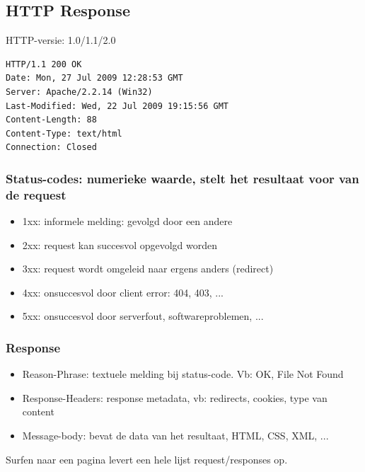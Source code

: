 \documentclass{article}
\begin{document}
\subsection{HTTP Response}
HTTP-versie: 1.0/1.1/2.0

\begin{lstlisting}
HTTP/1.1 200 OK
Date: Mon, 27 Jul 2009 12:28:53 GMT
Server: Apache/2.2.14 (Win32)
Last-Modified: Wed, 22 Jul 2009 19:15:56 GMT
Content-Length: 88
Content-Type: text/html
Connection: Closed
\end{lstlisting}

\subsubsection{Status-codes: numerieke waarde, stelt het resultaat voor van de request}
\begin{itemize}
    \item 1xx: informele melding: gevolgd door een andere
    \item 2xx: request kan succesvol opgevolgd worden
    \item 3xx: request wordt omgeleid naar ergens anders (redirect)
    \item 4xx: onsuccesvol door client error: 404, 403, ...
    \item 5xx: onsuccesvol door serverfout, softwareproblemen, ...
\end{itemize}

\subsubsection{Response}
\begin{itemize}
    \item Reason-Phrase: textuele melding bij status-code. Vb: OK, File Not Found
    \item Response-Headers: response metadata, vb: redirects, cookies, type van content
    \item Message-body: bevat de data van het resultaat, HTML, CSS, XML, ...
\end{itemize}

Surfen naar een pagina levert een hele lijst request/responses op.
\end{document}
